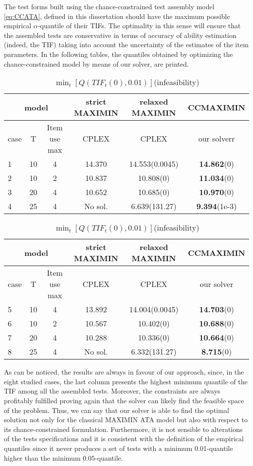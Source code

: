 The test forms built using the chance-constrained test assembly model \eqref{eq:CCATA}, defined in this dissertation should have the maximum possible empirical $\alpha$-quantile of their TIFs. The optimality in this sense will ensure that the assembled tests are conservative in terms of accuracy of ability estimation (indeed, the TIF) taking into account the uncertainty of the estimates of the item parameters. In the following tables, the quantiles obtained by optimizing the chance-constrained model by means of our solver, are printed. 

\begin{table}[H]
	\caption{ $\min_t\left[Q(TIF_t(0),0.05)\right]$(infeasibility)} 
	\begin{tabular}{l ccc c c}
		\toprule
		\multicolumn{3}{c}{model} & strict MAXIMIN & relaxed MAXIMIN & CCMAXIMIN \\
		\midrule
		case & T & Item use max &CPLEX & CPLEX & our solverr  \\
		\hline
		1& 10 & 4&  14.370 & 14.553(0.0045) & \textbf{14.862}(0)  \\
		2 &10 & 2&  10.837 & 10.808(0) & \textbf{11.034}(0) \\
		3& 20 & 4&  10.652 & 10.685(0) & \textbf{10.970}(0) \\
		4& 25 & 4&  No sol. & 6.639(131.27) &  \textbf{9.394}(1e-3) \\
		\bottomrule
	\end{tabular}
	\vspace{10pt}
	\caption{ $\min_t\left[Q(TIF_t(0),0.01)\right]$(infeasibility)} 
	\begin{tabular}{l cc c c c}
		\toprule
		\multicolumn{3}{c}{model} & strict MAXIMIN & relaxed MAXIMIN & CCMAXIMIN \\
		\midrule
		case & T & Item use max &CPLEX & CPLEX & our solver  \\
		\hline
		5& 10 & 4& 13.892  & 14.004(0.0045) & \textbf{14.703}(0)  \\
		6 &10 & 2& 10.567 & 10.402(0)  & \textbf{10.688}(0) \\
		7& 20 & 4& 10.288  & 10.336(0) & \textbf{10.664}(0) \\
		8& 25 & 4&  No sol. & 6.332(131.27) & \textbf{8.715}(0) \\
		\bottomrule
	\end{tabular}
\end{table}

As can be noticed, the results are always in favour of our approach, since, in the eight studied cases, the last column presents the highest minimum quantile of the TIF among all the assembled tests. Moreover, the constraints are always profitably fulfilled proving again that the solver can likely find the feasible space of the problem. Thus, we can say that our solver is able to find the optimal solution not only for the classical MAXIMIN ATA model but also with respect to its chance-constrained formulation. Furthermore, it is not sensible to alterations of the tests specifications and it is consistent with the definition of the empirical quantiles since it never produces a set of tests with a minimum 0.01-quantile higher than the minimum 0.05-quantile.

